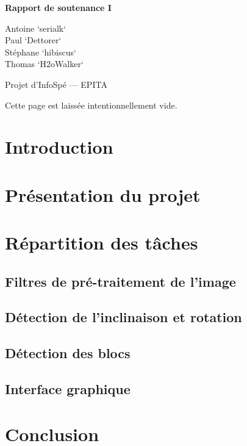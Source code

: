 \documentclass[12pt,a4paper]{article}
\newcommand{\subtitle}{Rapport de soutenance I}
\begin{document}
\begin{titlepage}
\begin{center}
\vspace{8cm}
\vspace{0.5cm}

\LARGE{\textbf{\subtitle}}
\vspace{1cm}

\large{\textsf{
Antoine `serialk`  \\
Paul `Dettorer`  \\
Stéphane `hibiscus`  \\
Thomas `H2oWalker` }}
\vspace{2cm}

\large{\textsf{Projet d'InfoSpé --- EPITA}}
\end{center}
\end{titlepage}

\newpage
Cette page est laissée intentionnellement vide.

\newpage
\setcounter{tocdepth}{3}
\tableofcontents

\newpage
\pagestyle{headings}
\section{Introduction}


\newpage
\section{Présentation du projet}


\newpage
\section{Répartition des tâches}
\subsection{Filtres de pré-traitement de l'image}

\subsection{Détection de l'inclinaison et rotation}

\subsection{Détection des blocs}

\subsection{Interface graphique}


\newpage
\section{Conclusion}

\end{document}
